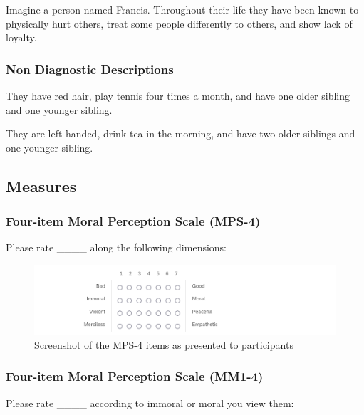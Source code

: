 \documentclass[
  american,
  man,mask,floatsintext]{apa6}
\begin{document}
Imagine a person named Francis.
Throughout their life they have been known to physically hurt others, treat some people differently to others, and show lack of loyalty.

\hypertarget{non-diagnostic-descriptions-1}{%
\subsubsection{Non Diagnostic Descriptions}\label{non-diagnostic-descriptions-1}}

They have red hair, play tennis four times a month, and have one older sibling and one younger sibling.

They are left-handed, drink tea in the morning, and have two older siblings and one younger sibling.

\hypertarget{measures}{%
\subsection{Measures}\label{measures}}

\hypertarget{four-item-moral-perception-scale-mps-4}{%
\subsubsection{Four-item Moral Perception Scale (MPS-4)}\label{four-item-moral-perception-scale-mps-4}}

Please rate \_\_\_\_ along the following dimensions:

\begin{figure}
\centering
\includegraphics{../resources/images/mps4.png}
\caption{Screenshot of the MPS-4 items as presented to participants}
\end{figure}

\hypertarget{four-item-moral-perception-scale-mm1-4}{%
\subsubsection{Four-item Moral Perception Scale (MM1-4)}\label{four-item-moral-perception-scale-mm1-4}}

Please rate \_\_\_\_ according to immoral or moral you view them:
\end{document}
